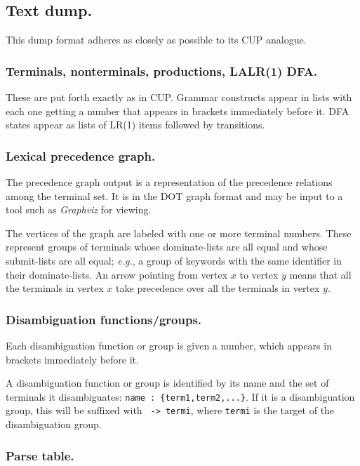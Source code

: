 \documentclass[12pt,english,twoside]{report}
\begin{document}
\subsection{Text dump.}

This dump format adheres as closely as possible to its CUP analogue.


\subsubsection{Terminals, nonterminals, productions, LALR(1) DFA.}

These are put forth exactly as in CUP. Grammar constructs appear in
lists with each one getting a number that appears in brackets immediately
before it. DFA states appear as lists of LR(1) items followed by transitions.

\subsubsection{Lexical precedence graph.}

The precedence graph output is a representation of the precedence
relations among the terminal set. It is in the DOT graph format and
may be input to a tool such as \emph{Graphviz} for viewing.

The vertices of the graph are labeled with one or more terminal
numbers. These represent groups of terminals whose dominate-lists are
all equal and whose submit-lists are all equal; \emph{e.g.}, a group
of keywords with the same identifier in their dominate-lists. An arrow
pointing from vertex $x$ to vertex $y$ means that all the terminals in
vertex $x$ take precedence over all the terminals in vertex $y$.

\subsubsection{Disambiguation functions/groups.}

Each disambiguation function or group is given a number, which appears
in brackets immediately before it.

A disambiguation function or group is identified by its name and the
set of terminals it disambiguates: \texttt{name :
  \{term1,term2,...\}}. If it is a disambiguation group, this will be
suffixed with \texttt{ -> termi}, where \texttt{termi} is the target
of the disambiguation group.

\subsubsection{Parse table.}
\end{document}
